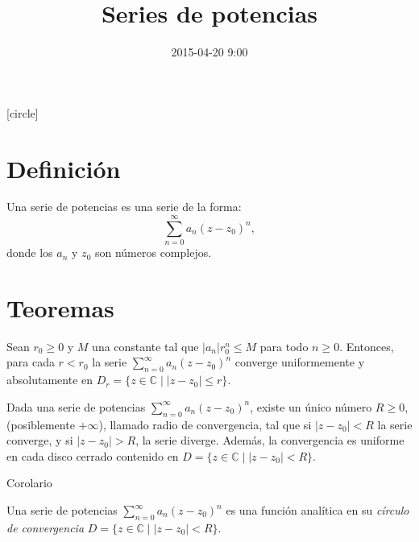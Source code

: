 \documentclass[spanish,presentation]{beamer}
\date{2015-04-20 9:00}
\title{Series de potencias}
\begin{document}
\maketitle
{}
[circle]

\tableofcontents

\section{Definición}
\label{sec:orgheadline1}

\begin{frame}[label=sec-1-1]{}
\begin{definition}
Una \alert{serie de potencias} es una serie de la forma:
\begin{displaymath}
\sum_{n=0}^{\infty}a_{n}(z-z_{0})^{n},
\end{displaymath}
donde los \(a_{n}\) y \(z_{0}\) son números complejos.
\end{definition}
\end{frame}

\section{Teoremas}
\label{sec:orgheadline1}

\begin{frame}[label=sec-2-1]{}
\begin{lemma}
Sean \(r_{0}\geq0\) y \(M\) una constante tal que
\(|a_{n}|r_{0}^{n}\leq M\) para todo \(n\geq0\). Entonces, para
cada \(r<r_{0}\) la serie
\(\sum_{n=0}^{\infty}a_{n}(z-z_{0})^{n}\) converge uniformemente y
absolutamente en \(D_{r}=\{z\in \mathbb{C}\mid |z-z_{0}|\leq r\}\).
\end{lemma}

\begin{theorem}
Dada una serie de potencias
\(\sum_{n=0}^{\infty}a_{n}(z-z_{0})^{n}\), existe un único número
\(R\geq0\), (posiblemente \(+\infty\)), llamado \alert{radio de
convergencia}, tal que si \(|z-z_{0}|<R\) la serie converge, y si
\(|z-z_{0}|>R\), la serie diverge. Además, la convergencia es
uniforme en cada disco cerrado contenido en \(D=\{z\in
    \mathbb{C}\mid |z-z_{0}|< R\}\). 
\end{theorem}
\end{frame}

\begin{frame}[label=sec-2-2]{Corolario}
\begin{corollary}
Una serie de potencias \(\sum_{n=0}^{\infty}a_{n}(z-z_{0})^{n}\)
es una función analítica en su \emph{círculo de convergencia} \(D=\{z\in
    \mathbb{C}\mid |z-z_{0}|< R\}\). 
\end{corollary}
\end{frame}
\end{document}

